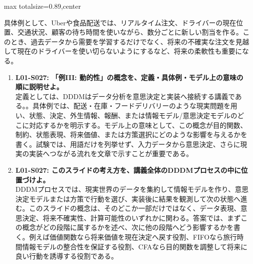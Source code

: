 \begin{minipage}[t]{0.58\textwidth}
\begin{adjustbox}{max totalsize={\textwidth}{0.89\textheight},center}
\begin{minipage}{\textwidth}
具体例として、Uberや食品配送では、リアルタイム注文、ドライバーの現在位置、交通状況、顧客の待ち時間を使いながら、数分ごとに新しい割当を作る。このとき、過去データから需要を学習するだけでなく、将来の不確実な注文を見越して現在のドライバーを使い切らないようにするなど、将来の柔軟性も重要になる。\par{}\begin{enumerate}\item \textbf{L01-S027: 「例III: 動的性」の概念を、定義・具体例・モデル上の意味の順に説明せよ。}\\定義としては、DDDMはデータ分析を意思決定と実装へ接続する講義である。。具体例では、配送・在庫・フードデリバリーのような現実問題を用い、状態、決定、外生情報、報酬、または情報モデル/意思決定モデルのどこに対応するかを明示する。モデル上の意味として、この概念が目的関数、制約、状態表現、将来価値、または方策選択にどのような影響を与えるかを書く。試験では、用語だけを列挙せず、入力データから意思決定、さらに現実の実装へつながる流れを文章で示すことが重要である。\item \textbf{L01-S027: このスライドの考え方を、講義全体のDDDMプロセスの中に位置づけよ。}\\DDDMプロセスでは、現実世界のデータを集約して情報モデルを作り、意思決定モデルまたは方策で行動を選び、実装後に結果を観測して次の状態へ進む。このスライドの概念は、そのどこか一部だけではなく、データ表現、意思決定、将来不確実性、計算可能性のいずれかに関わる。答案では、まずこの概念がどの段階に属するかを述べ、次に他の段階へどう影響するかを書く。例えば価値関数なら将来価値を現在決定へ戻す役割、FIFOなら旅行時間情報モデルの整合性を保証する役割、CFAなら目的関数を調整して将来に良い行動を誘導する役割である。\end{enumerate}
\end{minipage}
\end{adjustbox}
\end{minipage}


